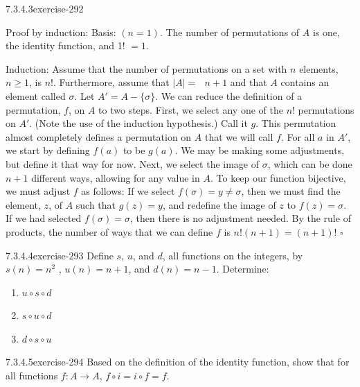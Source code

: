 \documentclass[twoside,10pt,]{book}
\numberwithin{equation}{section}
\begin{document}
\begin{divisionsolution}{7.3.4.3}{}{exercise-292}
\begin{enumerate}[label=(\alph*)]
Proof by induction: Basis: \((n=1)\).  The number of permutations of \(A\) is one, the identity function, and 1! \(=1\).%
\par
\hypertarget{p-2476}{}%
Induction: Assume that the number of permutations on a set with \(n\) elements, \(n\geq 1\), is \(n\)!. Furthermore, assume that \(|A|=\)\(\text{  }n+1\) and that \(A\) contains an element called \(\sigma\). Let \(A'=A-\{\sigma\}\). We can reduce the definition of a permutation, \(f\), on \(A\) to two steps. First, we select any one of the \(n\)! permutations on \(A'\). (Note the use of the induction hypothesis.) Call it \(g\). This permutation almost completely defines a permutation on \(A\) that we will call  \(f\).  For all \(a\) in \(A'\), we start by defining \(f(a)\) to be \(g(a)\). We may be making some adjustments, but define it that way for now. Next, we select the image of \(\sigma\), which can be done \(n+1\) different ways, allowing for any value in \(A\). To keep our function bijective, we must adjust \(f\) as follows: If we select \(f(\sigma)=y \neq \sigma\), then we must find the element, \(z\), of \(A\) such that \(g(z)=y\), and redefine the image  of \(z\) to \(f(z)=\sigma\). If we had selected \(f(\sigma)=\sigma\), then there is  no adjustment needed. By the rule of products, the number of ways that we can define \(f\) is \(n!(n+1)=(n+1)!\) \(\square\)%
\end{enumerate}
%
\end{divisionsolution}%
\begin{divisionsolution}{7.3.4.4}{}{exercise-293}%
\hypertarget{p-2477}{}%
Define \(s\), \(u\), and \(d\), all functions on the integers, by \(s(n) = n^2\) , \(u(n) = n + 1\), and \(d(n) = n-1\). Determine:%
\par
\hypertarget{p-2478}{}%
\leavevmode%
\begin{enumerate}[label=(\alph*)]
\item\hypertarget{li-1259}{}\hypertarget{p-2479}{}%
\(u \circ  s \circ  d\)%
\item\hypertarget{li-1260}{}\hypertarget{p-2480}{}%
\(s \circ  u\circ  d\)%
\item\hypertarget{li-1261}{}\hypertarget{p-2481}{}%
\(d \circ  s \circ  u\)%
\end{enumerate}
%
\end{divisionsolution}%
\begin{divisionsolution}{7.3.4.5}{}{exercise-294}%
\hypertarget{p-2482}{}%
Based on the definition of the identity function, show that for all functions \(f:A\to A\), \(f\circ i=i\circ f = f\).%
\end{divisionsolution}%
\end{document}
